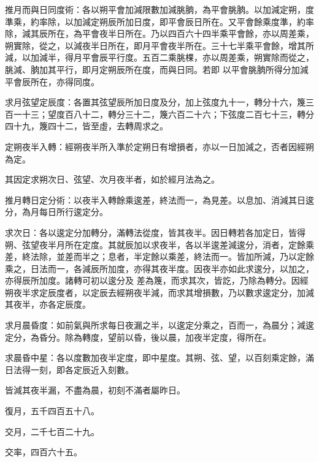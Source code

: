 \begin{pinyinscope}
 推月而與日同度術：各以朔平會加減限數加減朓朒，為平會朓朒。以加減定朔，度準乘，約率除，以加減定朔辰所加日度，即平會辰日所在。又平會餘乘度準，約率除，減其辰所在，為平會夜半日所在。乃以四百六十四半乘平會餘，亦以周差乘，朔實除，從之，以減夜半日所在，即月平會夜半所在。三十七半乘平會餘，增其所減，以加減半，得月平會辰平行度。五百二乘朓棵，亦以周差乘，朔實除而從之，朓減、朒加其平行，即月定朔辰所在度，而與日同。若即
 以平會朓朒所得分加減平會辰所在，亦得同度。



 求月弦望定辰度：各置其弦望辰所加日度及分，加上弦度九十一，轉分十六，篾三百一十三；望度百八十二，轉分三十二，篾六百二十六；下弦度二百七十三，轉分四十九，篾四十二，皆至虛，去轉周求之。



 定朔夜半入轉：經朔夜半所入準於定朔日有增損者，亦以一日加減之，否者因經朔為定。



 其因定求朔次日、弦望、次月夜半者，如於經月法為之。



 推月轉日定分術：以夜半入轉餘乘逡差，終法而一，為見差。以息加、消減其日逡分，為月每日所行逡定分。



 求次日：各以逡定分加轉分，滿轉法從度，皆其夜半。因日轉若各加定日，皆得朔、弦望夜半月所在定度。其就辰加以求夜半，各以半逡差減逡分，消者，定餘乘差，終法除，並差而半之；息者，半定餘以乘差，終法而一。皆加所減，乃以定餘乘之，日法而一，各減辰所加度，亦得其夜半度。因夜半亦如此求逡分，以加之，亦得辰所加度。諸轉可初以逡分及
 差為篾，而求其次，皆訖，乃除為轉分。因經朔夜半求定辰度者，以定辰去經朔夜半減，而求其增損數，乃以數求逡定分，加減其夜半，亦各定辰度。



 求月晨昏度：如前氣與所求每日夜漏之半，以逡定分乘之，百而一，為晨分；減逡定分，為昏分。除為轉度，望前以昏，後以晨，加夜半定度，得所在。



 求晨昏中星：各以度數加夜半定度，即中星度。其朔、弦、望，以百刻乘定餘，滿日法得一刻，即各定辰近入刻數。



 皆減其夜半漏，不盡為晨，初刻不滿者屬昨日。



 復月，五千四百五十八。



 交月，二千七百二十九。



 交率，四百六十五。




\end{pinyinscope}
